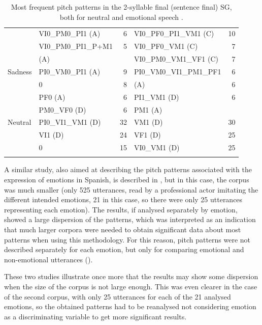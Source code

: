 \documentclass[output=paper]{langsci/langscibook}
\begin{document}
\begin{table}[p]
\begin{tabular}{llrlr}
         & VI0\_PM0\_PI1 (A)      & 6               & VI0\_PF0\_PI1\_VM1 (C)  & 10              \\
         & VI0\_PM0\_PI1\_P+M1    & 5               & VI0\_PF0\_VM1 (C)       & 7               \\
         & (A)                    &                 & VI0\_PM0\_VM1\_VF1 (C)  & 7               \\
\midrule
Sadness  & PI0\_VM0\_PI1 (A)      & 9               & PI0\_VM0\_VI1\_PM1\_PF1 & 6               \\
         & 0                      & 8               & (A)                     & 6               \\
         & PF0 (A)                & 6               & PI1\_VM1 (D)            & 6               \\
         & PM0\_VF0 (D)           & 6               & PM1 (A)                 &                 \\
\midrule
Neutral  & PI0\_VI1\_VM1 (D)      & 32              & VM1 (D)                 & 30              \\
         & VI1 (D)                & 24              & VF1 (D)                 & 25              \\
         & 0                      & 15              & VI0\_VM1 (D)            & 25  \\
\lspbottomrule         
\end{tabular}
\caption{Most frequent pitch patterns in the 2-syllable final (sentence final) SG, both for neutral and emotional speech \citep{Garrido2011}.}
\label{tab:gar:12}
\end{table}


A similar study, also aimed at describing the pitch patterns associated with the expression of emotions in Spanish, is described in \citet{Laplaza2014}, but in this case, the corpus was much smaller (only 525 utterances, read by a professional actor imitating the different intended emotions, 21 in this case, so there were only 25 utterances representing each emotion). The results, if analysed separately by emotion, showed a large dispersion of the patterns, which was interpreted as an indication that much larger corpora were needed to obtain significant data about most patterns when using this methodology. For this reason, pitch patterns were not described separately for each emotion, but only for comparing emotional and non-emotional utterances ().



These two studies illustrate once more that the results may show some dispersion when the size of the corpus is not large enough. This was even clearer in the case of the second corpus, with only 25 utterances for each of the 21 analysed emotions, so the obtained patterns had to be reanalysed not considering emotion as a discriminating variable to get more significant results.
\end{document}
